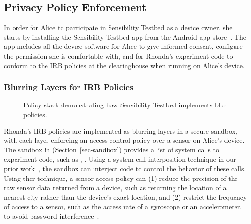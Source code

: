 
\subsection{Privacy Policy Enforcement}\label{sec-repy}

In order for Alice to participate in Sensibility Testbed as a device owner,
she starts by installing the Sensibility Testbed app from 
the Android app store~\cite{sensibility-app}. The app includes all the device
software for Alice to give informed consent, configure the permission she
is comfortable with, and for Rhonda's experiment code to conform to the 
IRB policies at the clearinghouse when running on Alice's device.

\subsubsection{Blurring Layers for IRB Policies}\label{sec-bob-policy}

\begin{figure}
\caption{\small Policy stack demonstrating how Sensibility Testbed implements blur policies.
\label{fig-blur}}
\end{figure}

Rhonda's IRB policies are implemented as blurring layers in a secure sandbox, with 
each layer enforcing an access control policy over a sensor on Alice's device. 
The sandbox in \sysname (Section~\ref{sec-sandbox}) provides a list of system 
calls to experiment code, such as , . 
Using a system call interposition technique in our prior work~\cite{cappos2010retaining}, 
the sandbox can interject code to control the behavior of these calls. Using ther 
technique, a sensor access policy can (1) reduce the precision of the raw sensor data 
returned from a device, such as returning the location of a nearest city rather than the 
device's exact location, and (2) restrict the frequency of access to a sensor, such as the 
access rate of a gyroscope or an accelerometer, to avoid password 
interference~\cite{michalevsky2014gyrophone}.


